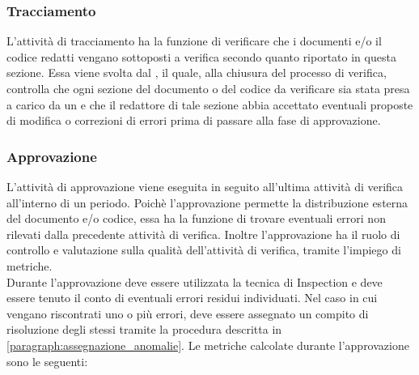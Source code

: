 \subsubsection{Tracciamento}
L'attività di tracciamento ha la funzione di verificare che i documenti e/o il codice redatti vengano sottoposti a verifica secondo quanto riportato in questa sezione. Essa viene svolta dal \roleProjectManager{}, il quale, alla chiusura del processo di verifica, controlla che ogni sezione del documento o del codice da verificare sia stata presa a carico da un \roleVerifier{} e che il redattore di tale sezione abbia accettato eventuali proposte di modifica o correzioni di errori prima di passare alla fase di approvazione.

\subsubsection{Approvazione}
L'attività di approvazione viene eseguita in seguito all'ultima attività di verifica all'interno di un periodo. Poichè l'approvazione permette la distribuzione esterna del documento e/o codice, essa ha la funzione di trovare eventuali errori non rilevati dalla precedente attività di verifica. Inoltre l'approvazione ha il ruolo di controllo e valutazione sulla qualità dell'attività di verifica, tramite l'impiego di metriche.\\
Durante l'approvazione deve essere utilizzata la tecnica di Inspection e deve essere tenuto il conto di eventuali errori residui individuati. Nel caso in cui vengano riscontrati uno o più errori, deve essere assegnato un compito di risoluzione degli stessi tramite la procedura descritta in \ref{paragraph:assegnazione_anomalie}. 
Le metriche calcolate durante l'approvazione sono le seguenti:
